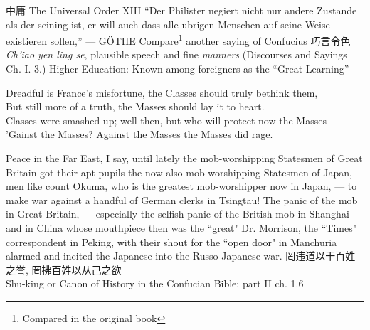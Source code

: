 \begin{thebibliography}{30}
     中庸 The Universal Order XIII
     ``Der Philister negiert nicht nur andere Zustande als der seining ist, er will auch dass alle ubrigen Menschen auf seine Weise existieren sollen,'' --- G\"OTHE
     Compare\footnote{Compared in the original book} another saying of Confucius 巧言令色 \emph{Ch'iao yen ling se}, plausible speech and fine \emph{manners} (Discourses and Sayings Ch. I. 3.)
     Higher Education: Known among foreigners as the ``Great Learning''
     \begin{center}
    Dreadful is France's misfortune, the Classes should truly bethink them, \\
    But still more of a truth, the Masses should lay it to heart.\\
    Classes were smashed up; well then, but who will protect now the Masses\\
    'Gainst the Masses? Against the Masses the Masses did rage. \\
\end{center}
     Peace in the Far East, I say, until lately the mob-worshipping Statesmen of Great Britain got their apt pupils the now also mob-worshipping Statesmen of Japan, men like count Okuma, who is the greatest mob-worshipper now in Japan, --- to make war against a handful of German clerks in Tsingtau!
     The panic of the mob in Great Britain, --- especially the selfish panic of the British mob in Shanghai and in China whose mouthpiece then was the ``great" Dr. Morrison, the ``Times" correspondent in Peking, with their shout for the ``open door" in Manchuria alarmed and incited the Japanese into the Russo Japanese war.
     罔违道以干百姓之誉, 罔拂百姓以从己之欲 \\ Shu-king or Canon of History in the Confucian Bible: part II ch. 1.6
\end{thebibliography}
